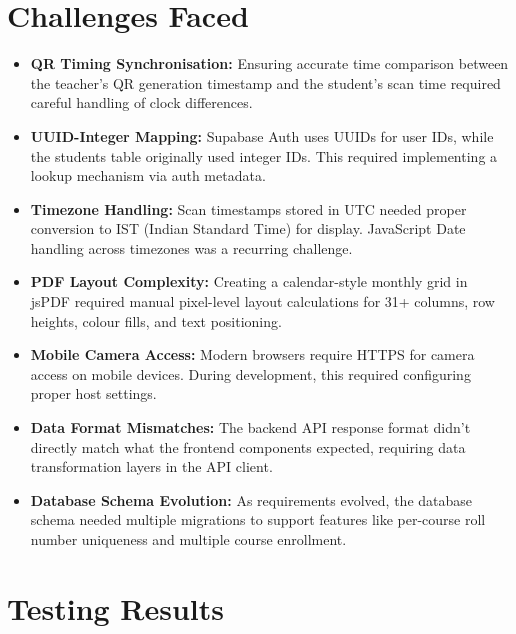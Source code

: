 \documentclass{SOICTthesis}
\begin{document}
\section{Challenges Faced}
\label{sec:challenges}

\begin{itemize}
    \item \textbf{QR Timing Synchronisation:} Ensuring accurate time comparison between the teacher's QR generation timestamp and the student's scan time required careful handling of clock differences.

    \item \textbf{UUID-Integer Mapping:} Supabase Auth uses UUIDs for user IDs, while the students table originally used integer IDs. This required implementing a lookup mechanism via auth metadata.

    \item \textbf{Timezone Handling:} Scan timestamps stored in UTC needed proper conversion to IST (Indian Standard Time) for display. JavaScript Date handling across timezones was a recurring challenge.

    \item \textbf{PDF Layout Complexity:} Creating a calendar-style monthly grid in jsPDF required manual pixel-level layout calculations for 31+ columns, row heights, colour fills, and text positioning.

    \item \textbf{Mobile Camera Access:} Modern browsers require HTTPS for camera access on mobile devices. During development, this required configuring proper host settings.

    \item \textbf{Data Format Mismatches:} The backend API response format didn't directly match what the frontend components expected, requiring data transformation layers in the API client.

    \item \textbf{Database Schema Evolution:} As requirements evolved, the database schema needed multiple migrations to support features like per-course roll number uniqueness and multiple course enrollment.
\end{itemize}

\section{Testing Results}
\label{sec:testing}
\end{document}
